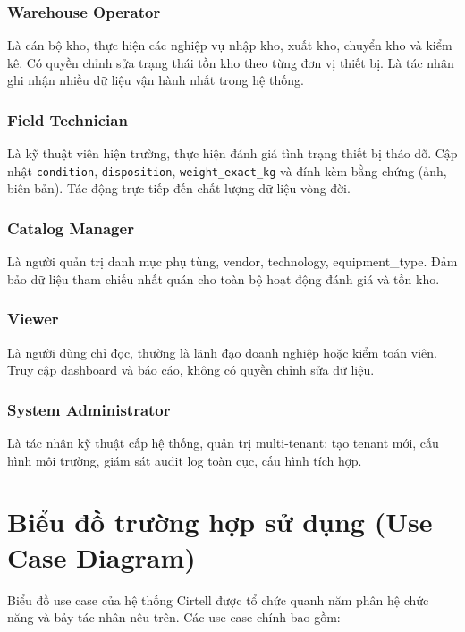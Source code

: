 \subsubsection*{Warehouse Operator}
Là cán bộ kho, thực hiện các nghiệp vụ nhập kho, xuất kho, chuyển kho và kiểm kê. Có quyền chỉnh sửa trạng thái tồn kho theo từng đơn vị thiết bị. Là tác nhân ghi nhận nhiều dữ liệu vận hành nhất trong hệ thống.

\subsubsection*{Field Technician}
Là kỹ thuật viên hiện trường, thực hiện đánh giá tình trạng thiết bị tháo dỡ. Cập nhật \texttt{condition}, \texttt{disposition}, \texttt{weight\_exact\_kg} và đính kèm bằng chứng (ảnh, biên bản). Tác động trực tiếp đến chất lượng dữ liệu vòng đời.

\subsubsection*{Catalog Manager}
Là người quản trị danh mục phụ tùng, vendor, technology, equipment\_type. Đảm bảo dữ liệu tham chiếu nhất quán cho toàn bộ hoạt động đánh giá và tồn kho.

\subsubsection*{Viewer}
Là người dùng chỉ đọc, thường là lãnh đạo doanh nghiệp hoặc kiểm toán viên. Truy cập dashboard và báo cáo, không có quyền chỉnh sửa dữ liệu.

\subsubsection*{System Administrator}
Là tác nhân kỹ thuật cấp hệ thống, quản trị multi-tenant: tạo tenant mới, cấu hình môi trường, giám sát audit log toàn cục, cấu hình tích hợp.

\section{Biểu đồ trường hợp sử dụng (Use Case Diagram)}
\label{sec:usecase}
Biểu đồ use case của hệ thống Cirtell được tổ chức quanh năm phân hệ chức năng và bảy tác nhân nêu trên. Các use case chính bao gồm:


